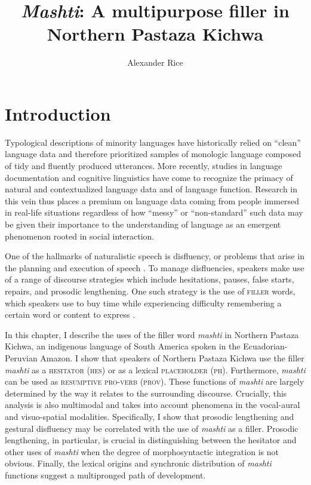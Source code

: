 \documentclass[output=paper]{langscibook}
\author{Alexander Rice\orcid{}\affiliation{University of Alberta}}
\title{\textit{Mashti}: \uppercase{A} multipurpose filler in \uppercase{N}orthern \uppercase{P}astaza \uppercase{K}ichwa}
\begin{document}
\maketitle 
\graphicspath{{figures/rice}}

\section{Introduction}
\label{sec:rice:1}

Typological descriptions of minority languages have historically relied on “clean” language data and therefore prioritized samples of monologic language composed of tidy and fluently produced utterances. More recently, studies in language documentation and cognitive linguistics have come to recognize the primacy of natural and contextualized language data and of language function. Research in this vein thus places a premium on language data coming from people immersed in real-life situations regardless of how “messy” or “non-standard” such data may be given their importance to the understanding of language as an emergent phenomenon rooted in social interaction.

One of the hallmarks of naturalistic speech is disfluency, or problems that arise in the planning and execution of speech \citep[452]{Lickley2015}.  To manage disfluencies, speakers make use of a range of discourse strategies which include hesitations, pauses, false starts, repairs, and prosodic lengthening. One such strategy is the use of \textsc{filler} words, which speakers use to buy time while experiencing difficulty remembering a certain word or content to express \citep{Fox2010}.

In this chapter, I describe the uses of the filler word \textit{mashti} in Northern Pastaza Kichwa, an indigenous language of South America spoken in the Ecuadorian-Peruvian Amazon. I show that speakers of Northern Pastaza Kichwa use the filler \textit{mashti} as a \textsc{hesitator} (\textsc{hes}) or as a lexical \textsc{placeholder} (\textsc{ph}). Furthermore, \textit{mashti} can be used as \textsc{resumptive} \textsc{pro-verb} (\textsc{prov}). These functions of \textit{mashti} are largely determined by the way it relates to the surrounding discourse. Crucially, this analysis is also multimodal and takes into account phenomena in the vocal-aural and visuo-spatial modalities. Specifically, I show that prosodic lengthening and gestural disfluency may be correlated with the use of \textit{mashti} as a filler. Prosodic lengthening, in particular, is crucial in distinguishing between the hesitator and other uses of \textit{mashti} when the degree of morphosyntactic integration is not obvious. Finally, the lexical origins and synchronic distribution of \textit{mashti} functions suggest a multipronged path of development.
\end{document}
